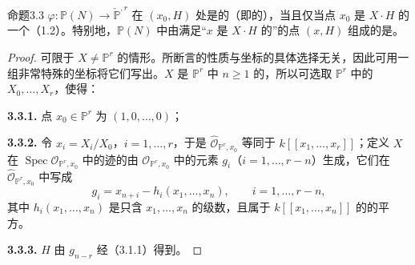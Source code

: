 \begin{SGAresult}{命题}{3.3}
 $\varphi:\mathbb P(N)\to\check{\mathbb P}^{,r}$ 在 $(x_0,H)$ 处是的（即的），当且仅当点 $x_0$ 是 $X\cdot H$ 的一个（1.2）。特别地，$\mathbb P(N)$ 中由满足“$x$ 是 $X\cdot H$ 的”的点 $(x,H)$ 组成的是。
\end{SGAresult}
\begin{proof}
可限于 $X\ne\mathbb P^r$ 的情形。所断言的性质与坐标的具体选择无关，因此可用一组非常特殊的坐标将它们写出。$X$ 是 $\mathbb P^r$ 中 $n\geq1$ 的，所以可选取 $\mathbb P^r$ 中的 $X_0,\ldots,X_r$，使得：

\textbf{3.3.1.} 点 $x_0\in\mathbb P^r$ 为 $(1,0,\ldots,0)$；

\textbf{3.3.2.} 令 $x_i=X_i/X_0$，$i=1,\ldots,r$，于是 $\widehat{\mathcal O}_{\mathbb P^r,x_0}$ 等同于 $k[[x_1,\ldots,x_r]]$；定义 $X$ 在 $\operatorname{Spec}\mathcal O_{\mathbb P^r,x_0}$ 中的迹的由 $\mathcal O_{\mathbb P^r,x_0}$ 中的元素 $g_i$（$i=1,\ldots,r-n$）生成，它们在 $\widehat{\mathcal O}_{\mathbb P^r,x_0}$ 中写成
\[
g_i=x_{n+i}-h_i(x_1,\ldots,x_n),\qquad i=1,\ldots,r-n,
\]
其中 $h_i(x_1,\ldots,x_n)$ 是只含 $x_1,\ldots,x_n$ 的级数，且属于 $k[[x_1,\ldots,x_n]]$ 的的平方。

\textbf{3.3.3.}  $H$ 由 $g_{n-r}$ 经（3.1.1）得到。


\end{proof}
